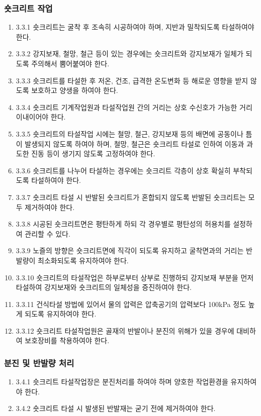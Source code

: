 \subsubsection{숏크리트 작업}
\begin{enumerate}
\item  3.3.1 숏크리트는 굴착 후 조속히 시공하여야 하며, 지반과 밀착되도록 타설하여야 한다.   
\item  3.3.2 강지보재, 철망, 철근 등이 있는 경우에는 숏크리트와 강지보재가 일체가 되도록 주의해서 뿜어붙여야 한다.  
\item  3.3.3 숏크리트를 타설한 후 저온, 건조, 급격한 온도변화 등 해로운 영향을 받지 않도록 보호하고 양생을 하여야 한다.  
\item  3.3.4 숏크리트 기계작업원과 타설작업원 간의 거리는 상호 수신호가 가능한 거리 이내이어야 한다.  
\item  3.3.5 숏크리트의 타설작업 시에는 철망, 철근, 강지보재 등의 배면에 공동이나 틈이 발생되지 않도록 하여야 하며, 철망, 철근은 숏크리트 타설로 인하여 이동과 과도한 진동 등이 생기지 않도록 고정하여야 한다.  
\item  3.3.6 숏크리트를 나누어 타설하는 경우에는 숏크리트 각층이 상호 확실히 부착되도록 타설하여야 한다.  
\item  3.3.7 숏크리트 타설 시 반발된 숏크리트가 혼합되지 않도록 반발된 숏크리트는 모두 제거하여야 한다.  
\item  3.3.8 시공된 숏크리트면은 평탄하게 하되 각 경우별로 평탄성의 허용치를 설정하여 관리할 수 있다.  
\item  3.3.9 노즐의 방향은 숏크리트면에 직각이 되도록 유지하고 굴착면과의 거리는 반발량이 최소화되도록 유지하여야 한다.  
\item  3.3.10 숏크리트의 타설작업은 하부로부터 상부로 진행하되 강지보재 부분을 먼저 타설하여 강지보재와 숏크리트의 일체성을 증진하여야 한다.  
\item  3.3.11 건식타설 방법에 있어서 물의 압력은 압축공기의 압력보다 100kPa 정도 높게 되도록 유지하여야 한다.  
\item  3.3.12 숏크리트 타설작업원은 골재의 반발이나 분진의 위해가 있을 경우에 대비하여 보호장비를 착용하여야 한다.  
\end{enumerate}

\subsubsection{분진 및 반발량 처리}
\begin{enumerate}
\item  3.4.1 숏크리트 타설작업장은 분진처리를 하여야 하며 양호한 작업환경을 유지하여야 한다.   
\item  3.4.2 숏크리트 타설 시 발생된 반발재는 굳기 전에 제거하여야 한다.  
\end{enumerate}

